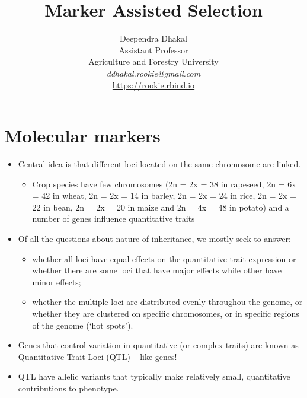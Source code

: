 \documentclass[
  ignorenonframetext,
  aspectratio=169]{beamer}
\title{Marker Assisted Selection}
\author{Deependra Dhakal\\
Assistant Professor\\
Agriculture and Forestry University\\
\textit{ddhakal.rookie@gmail.com}\\
\url{https://rookie.rbind.io}}
\date{}
\providecommand{\tightlist}{%
  \setlength{\itemsep}{0pt}\setlength{\parskip}{0pt}}
\begin{document}
\frame{\titlepage}

\begin{frame}[allowframebreaks]
  \tableofcontents[hideallsubsections]
\end{frame}
\hypertarget{molecular-markers}{%
\section{Molecular markers}\label{molecular-markers}}

\begin{frame}{}
\protect\hypertarget{section}{}
\begin{itemize}
\tightlist
\item
  Central idea is that different loci located on the same chromosome are
  \alert{linked}.

  \begin{itemize}
  \tightlist
  \item
    Crop species have few chromosomes (2n = 2x = 38 in rapeseed, 2n = 6x
    = 42 in wheat, 2n = 2x = 14 in barley, 2n = 2x = 24 in rice, 2n = 2x
    = 22 in bean, 2n = 2x = 20 in maize and 2n = 4x = 48 in potato) and
    a number of genes influence quantitative traits
  \end{itemize}
\item
  Of all the questions about nature of inheritance, we mostly seek to
  answer:

  \begin{itemize}
  \tightlist
  \item
    whether all loci have equal effects on the quantitative trait
    expression or whether there are some loci that have major effects
    while other have minor effects;
  \item
    whether the multiple loci are distributed evenly throughou the
    genome, or whether they are clustered on specific chromosomes, or in
    specific regions of the genome (`hot spots').
  \end{itemize}
\item
  Genes that control variation in quantitative (or complex traits) are
  known as Quantitative Trait Loci (QTL) -- like genes!
\item
  QTL have allelic variants that typically make relatively small,
  quantitative contributions to phenotype.
\end{itemize}
\end{frame}
\end{document}
